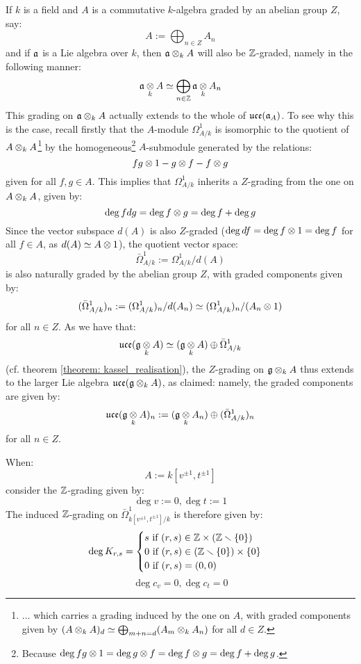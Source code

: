         \begin{remark} \label{remark: Z_gradings_on_toroidal_lie_algebras}
            If $k$ is a field and $A$ is a commutative $k$-algebra graded by an abelian group $Z$, say:
                $$A := \bigoplus_{n \in Z} A_n$$
            and if $\mathfrak{a}$ is a Lie algebra over $k$, then $\a \tensor_k A$ will also be $\mathbb{Z}$-graded, namely in the following manner:
                $$\a \tensor_k A \cong \bigoplus_{n \in \Z} \a \tensor_k A_n$$
            This grading on $\a \tensor_k A$ actually extends to the whole of $\mathfrak{uce}(\mathfrak{a}_A)$. To see why this is the case, recall firstly that the $A$-module $\Omega^1_{A/k}$ is isomorphic to the quotient of $A \tensor_k A$\footnote{... which carries a grading induced by the one on $A$, with graded components given by $(A \tensor_k A)_d \cong \bigoplus_{m + n = d} (A_m \tensor_k A_n)$ for all $d \in Z$.} by the homogeneous\footnote{Because $\deg fg \tensor 1 = \deg g \tensor f = \deg f \tensor g = \deg f + \deg g$.} $A$-submodule generated by the relations:
                $$fg \tensor 1 - g \tensor f - f \tensor g$$
            given for all $f, g \in A$. This implies that $\Omega^1_{A/k}$ inherits a $Z$-grading from the one on $A \tensor_k A$, given by:
                $$\deg f dg = \deg f \tensor g = \deg f + \deg g$$
            Since the vector subspace $d(A)$ is also $Z$-graded ($\deg df = \deg f \tensor 1 = \deg f$ for all $f \in A$, as $d(A) \cong A \tensor 1$), the quotient vector space:
                $$\bar{\Omega}^1_{A/k} := \Omega^1_{A/k}/d(A)$$
            is also naturally graded by the abelian group $Z$, with graded components given by:
                $$(\bar{\Omega}^1_{A/k})_n := (\Omega^1_{A/k})_n/d(A_n) \cong (\Omega^1_{A/k})_n/(A_n \tensor 1)$$
            for all $n \in Z$. As we have that:
                $$\uce(\g \tensor_k A) \cong (\g \tensor_k A) \oplus \bar{\Omega}^1_{A/k}$$
            (cf. theorem \ref{theorem: kassel_realisation}), the $Z$-grading on $\g \tensor_k A$ thus extends to the larger Lie algebra $\uce(\g \tensor_k A)$, as claimed: namely, the graded components are given by:
                $$\uce(\g \tensor_k A)_n := (\g \tensor_k A_n) \oplus (\bar{\Omega}^1_{A/k})_n$$
            for all $n \in Z$. 

            When:
                $$A := k[v^{\pm 1}, t^{\pm 1}]$$
            consider the $\mathbb{Z}$-grading given by:
                $$\deg v := 0, \deg t := 1$$
            The induced $\mathbb{Z}$-grading on $\bar{\Omega}^1_{k[v^{\pm 1}, t^{\pm 1}]/k}$ is therefore given by:
                $$
                    \deg K_{r, s} =
                    \begin{cases}
                        \text{$s$ if $(r, s) \in \Z \x (\Z \setminus \{0\})$}
                        \\
                        \text{$0$ if $(r, s) \in (\Z \setminus \{0\}) \x \{0\}$}
                        \\
                        \text{$0$ if $(r, s) = (0, 0)$}
                    \end{cases}
                $$
                $$\deg c_v = 0, \deg c_t = 0$$
        \end{remark}
        
